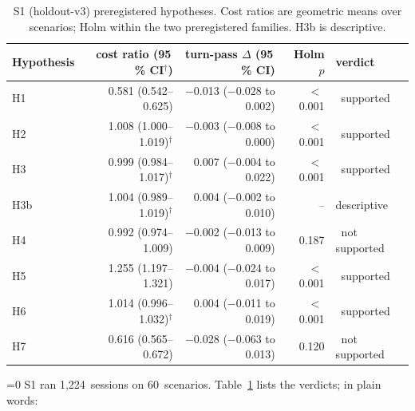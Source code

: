 \documentclass[11pt,letterpaper]{article}
\newcommand{\ok}{\textcolor{okgreen}{\ding{51}}}
\newcommand{\no}{\textcolor{okorange}{\ding{55}}}
\newcommand{\SOnePending}{0}
\newcommand{\SOneScen}{60}
\newcommand{\SOneSessions}{1{,}224}
\begin{document}
\begin{table}[htbp]\centering\small
\caption{S1 (holdout-v3) preregistered hypotheses. Cost ratios are geometric means over scenarios; Holm within the two
preregistered families. H3b is descriptive.}\label{tab:s1hyp}
\begin{tabular*}{\textwidth}{@{\extracolsep{\fill}}l r r r l@{}}
\toprule
Hypothesis & cost ratio (95\,\% CI$^{\dagger}$) & turn-pass $\Delta$ (95\,\% CI) & Holm $p$ & verdict \\
\midrule
H1 & 0.581 (0.542--0.625) & $-$0.013 ($-$0.028 to 0.002) & $<$\,0.001 & \ok\ supported \\
H2 & 1.008 (1.000--1.019)$^{\dagger}$ & $-$0.003 ($-$0.008 to 0.000) & $<$\,0.001 & \ok\ supported \\
H3 & 0.999 (0.984--1.017)$^{\dagger}$ & 0.007 ($-$0.004 to 0.022) & $<$\,0.001 & \ok\ supported \\
H3b & 1.004 (0.989--1.019)$^{\dagger}$ & 0.004 ($-$0.002 to 0.010) & -- & descriptive \\
H4 & 0.992 (0.974--1.009) & $-$0.002 ($-$0.013 to 0.009) & 0.187 & \no\ not supported \\
H5 & 1.255 (1.197--1.321) & $-$0.004 ($-$0.024 to 0.017) & $<$\,0.001 & \ok\ supported \\
H6 & 1.014 (0.996--1.032)$^{\dagger}$ & 0.004 ($-$0.011 to 0.019) & $<$\,0.001 & \ok\ supported \\
H7 & 0.616 (0.565--0.672) & $-$0.028 ($-$0.063 to 0.013) & 0.120 & \no\ not supported \\
\bottomrule
\end{tabular*}
\par{}
\end{table}
 \ifnum\SOnePending=0
S1 ran \SOneSessions\ sessions on \SOneScen\ scenarios. Table~\ref{tab:s1hyp} lists the verdicts; in plain words:
\end{document}

